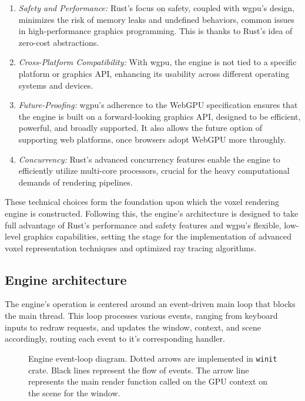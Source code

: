 \begin{enumerate}
  \item \emph{Safety and Performance:} Rust’s focus on safety, coupled with wgpu's design, minimizes the risk of memory leaks and undefined behaviors, common issues in high-performance graphics programming. This is thanks to Rust's idea of zero-cost abstractions.

  \item \emph{Cross-Platform Compatibility:} With wgpu, the engine is not tied to a specific platform or graphics API, enhancing its usability across different operating systems and devices.

  \item \emph{Future-Proofing:} wgpu's adherence to the WebGPU specification ensures that the engine is built on a forward-looking graphics API, designed to be efficient, powerful, and broadly supported. It also allows the future option of supporting web platforms, once browsers adopt WebGPU more throughly.

  \item \emph{Concurrency:} Rust’s advanced concurrency features enable the engine to efficiently utilize multi-core processors, crucial for the heavy computational demands of rendering pipelines.
\end{enumerate}

These technical choices form the foundation upon which the voxel rendering engine is constructed. Following this, the engine's architecture is designed to take full advantage of Rust's performance and safety features and wgpu's flexible, low-level graphics capabilities, setting the stage for the implementation of advanced voxel representation techniques and optimized ray tracing algorithms.


\subsection{Engine architecture}

The engine's operation is centered around an event-driven main loop that blocks the main thread.
This loop processes various events, ranging from keyboard inputs to redraw requests, and updates the window, context, and scene accordingly, routing each event to it's corresponding handler.

\begin{figure}[H]
  \centering
  
  \caption{Engine event-loop diagram. Dotted arrows are implemented in \texttt{winit} crate. Black lines represent the flow of events. The arrow line represents the main render function called on the GPU context on the scene for the window.}
\end{figure}


